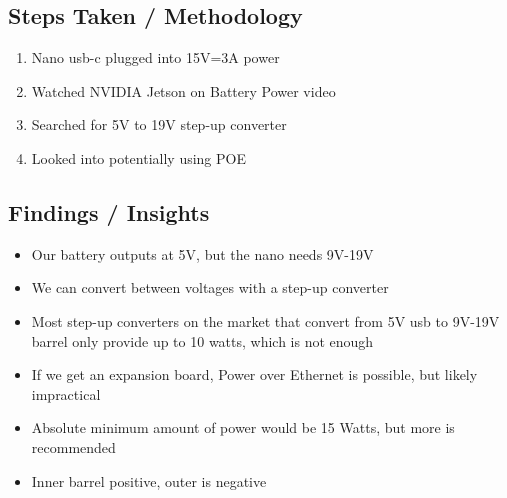 \subsection{Steps Taken / Methodology}
\begin{enumerate}
    \item Nano usb-c plugged into 15V=3A power
    \item Watched NVIDIA Jetson on Battery Power video
    \item Searched for 5V to 19V step-up converter
    \item Looked into potentially using POE
\end{enumerate}

\subsection{Findings / Insights}
\begin{itemize}
    \item Our battery outputs at 5V, but the nano needs 9V-19V
    \item We can convert between voltages with a step-up converter
    \item Most step-up converters on the market that convert from 5V usb to 9V-19V barrel only provide up to 10 watts, which is not enough
    \item If we get an expansion board, Power over Ethernet is possible, but likely impractical
    \item Absolute minimum amount of power would be 15 Watts, but more is recommended
    \item Inner barrel positive, outer is negative
\end{itemize}

